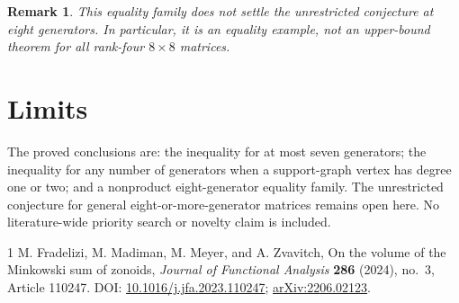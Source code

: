 \documentclass[11pt]{article}
\newtheorem{remark}[theorem]{Remark}
\begin{document}
\begin{remark}
This equality family does not settle the unrestricted conjecture at eight generators. In particular, it is an equality example, not an upper-bound theorem for all rank-four $8\times8$ matrices.
\end{remark}

\section{Limits}
The proved conclusions are: the inequality for at most seven generators; the inequality for any number of generators when a support-graph vertex has degree one or two; and a nonproduct eight-generator equality family. The unrestricted conjecture for general eight-or-more-generator matrices remains open here. No literature-wide priority search or novelty claim is included.

\begin{thebibliography}{1}
M. Fradelizi, M. Madiman, M. Meyer, and A. Zvavitch,
\newblock On the volume of the Minkowski sum of zonoids,
\newblock \emph{Journal of Functional Analysis} \textbf{286} (2024), no.~3, Article 110247.
\newblock DOI: \href{https://doi.org/10.1016/j.jfa.2023.110247}{10.1016/j.jfa.2023.110247};
\href{https://arxiv.org/abs/2206.02123}{arXiv:2206.02123}.
\end{thebibliography}
\end{document}
